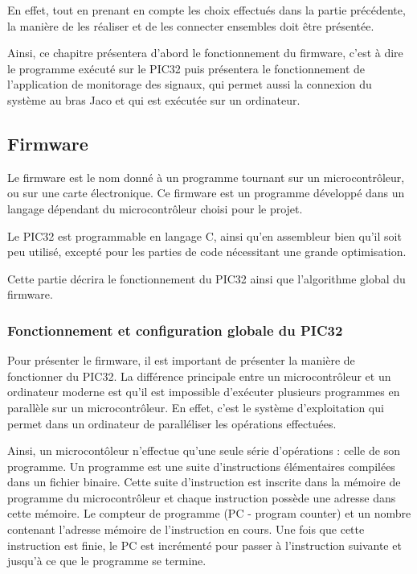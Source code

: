 \documentclass[letterpaper, twoside, 12pt, memoire, creativecommons, hyperref]{thETS}
\begin{document}
En effet, tout en prenant en compte les choix effectués dans la partie précédente, la manière de les réaliser et de les connecter ensembles doit être présentée. 

Ainsi, ce chapitre présentera d'abord le fonctionnement du firmware, c'est à dire le programme exécuté sur le PIC32 puis présentera le fonctionnement de l'application de monitorage des signaux, qui permet aussi la connexion du système au bras Jaco et qui est exécutée sur un ordinateur. 

\subsection{Firmware}

Le firmware est le nom donné à un programme tournant sur un microcontrôleur, ou sur une carte électronique. Ce firmware est un programme développé dans un langage dépendant du microcontrôleur choisi pour le projet. 

Le PIC32 est programmable en langage C, ainsi qu'en assembleur bien qu'il soit peu utilisé, excepté pour les parties de code nécessitant une grande optimisation. 

Cette partie décrira le fonctionnement du PIC32 ainsi que l'algorithme global du firmware. 

\subsubsection{Fonctionnement et configuration globale du PIC32}

Pour présenter le firmware, il est important de présenter la manière de fonctionner du PIC32. La différence principale entre un microcontrôleur et un ordinateur moderne est qu'il est impossible d'exécuter plusieurs programmes en parallèle sur un microcontrôleur. En effet, c'est le système d'exploitation qui permet dans un ordinateur de paralléliser les opérations effectuées. 

Ainsi, un microcontôleur n'effectue qu'une seule série d'opérations : celle de son programme. Un programme est une suite d'instructions élémentaires compilées dans un fichier binaire. Cette suite d'instruction est inscrite dans la mémoire de programme du microcontrôleur et chaque instruction possède une adresse dans cette mémoire. Le compteur de programme (PC - program counter) et un nombre contenant l'adresse mémoire de l'instruction en cours. Une fois que cette instruction est finie, le PC est incrémenté pour passer à l'instruction suivante et jusqu'à ce que le programme se termine. 
\end{document}
